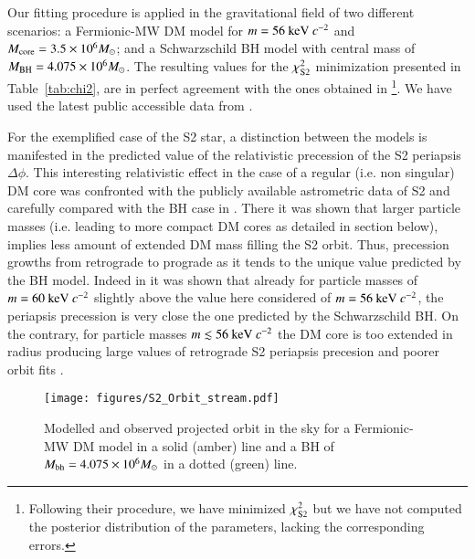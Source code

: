\documentclass[twocolumn]{aa}
\begin{document}
Our fitting procedure is applied in the gravitational field of two different scenarios: a Fermionic-MW DM model for $m=56~{\rm keV}~c^{-2}$ and $M_{\rm{core}}=3.5\times 10^6 M_\odot$; and a Schwarzschild BH model with central mass of $M_{\rm BH}=4.075\times 10^6 M_\odot$.
The resulting values for the $\chi^2_{\rm{S2}}$ minimization presented in Table~\ref{tab:chi2}, are in perfect agreement with the ones obtained in \cite{2020A&A...641A..34B}\footnote{Following their procedure, we have minimized $\chi^2_{\rm{S2}}$ but we have not computed the posterior distribution of the parameters, lacking the corresponding errors.}.
We have used the latest public accessible data from \cite{2019Sci...365..664D}.

For the exemplified case of the S2 star, a distinction between the models is manifested in the predicted value of the relativistic precession of the S2 periapsis $\Delta \phi$. This interesting relativistic effect in the case of a regular (i.e. non singular) DM core was confronted with the publicly available astrometric data of S2 and carefully compared with the BH case in \cite{2022MNRAS.511L..35A}. There it was shown that larger particle masses (i.e. leading to more compact DM cores as detailed in section below), implies less amount of extended DM mass filling the S2 orbit. Thus, precession growths from retrograde to prograde as it tends to the unique value predicted by the BH model. Indeed in \cite{2022MNRAS.511L..35A} it was shown that already for particle masses of $m = 60~{\rm keV}~c^{-2}$ slightly above the value here considered of $m=56~{\rm keV}~c^{-2}$, the periapsis precession is very close the one predicted by the Schwarzschild BH. On the contrary, for particle masses $m\lesssim 56~{\rm keV}~c^{-2}$ the DM core is too extended in radius producing large values of retrograde S2 periapsis precesion and poorer orbit fits \citep{2020A&A...641A..34B,2022MNRAS.511L..35A}. %
%
%
\begin{figure}
   \texttt{[image: figures/S2\_Orbit\_stream.pdf]}
\caption{Modelled and observed projected orbit in the sky for a Fermionic-MW DM model in a solid (amber) line and a BH of $M_{\rm bh}=4.075\times 10^6 M_\odot$ in a dotted (green) line.}
   \label{fig:S2_fit}
\end{figure}
\end{document}
